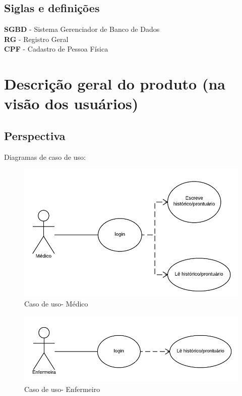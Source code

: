 \documentclass[12pt,a4paper]{report}
\begin{document}
\subsection{Siglas e definições}

\textbf{SGBD} - Sistema Gerenciador de Banco de Dados \\
\textbf{RG}   - Registro Geral\\
\textbf{CPF}  - Cadastro de Pessoa Física\\



\section{Descrição geral do produto (na visão dos usuários)}

\subsection{Perspectiva} 

Diagramas de caso de uso:

\begin{figure}[h!]
  \caption{Caso de uso- Médico}
  \centering
  \includegraphics[scale=.5]{doctor.png}
\end{figure}

\begin{figure}[h!]
  \caption{Caso de uso- Enfermeiro}
  \centering
  \includegraphics[scale=.5]{nurse.png}
\end{figure}
\end{document}
